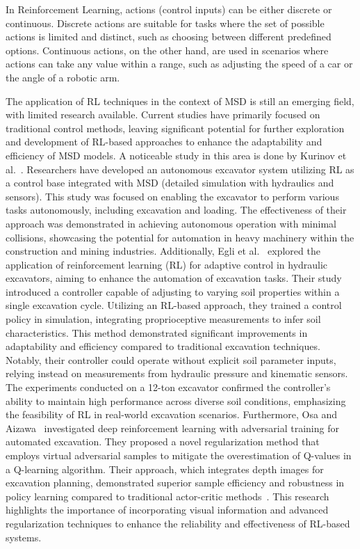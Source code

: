 In Reinforcement Learning, actions (control inputs) can be either discrete or continuous. Discrete actions are suitable for tasks where the set of possible actions is limited and distinct, such as choosing between different predefined options. Continuous actions, on the other hand, are used in scenarios where actions can take any value within a range, such as adjusting the speed of a car or the angle of a robotic arm. 

The application of RL techniques in the context of MSD is still an emerging field, with limited research available. Current studies have primarily focused on traditional control methods, leaving significant potential for further exploration and development of RL-based approaches to enhance the adaptability and efficiency of MSD models. A noticeable study in this area is done by Kurinov et al.~\cite{kurinov2020autoexcavator}. Researchers have developed an autonomous excavator system utilizing RL as a control base integrated with MSD (detailed simulation with hydraulics and sensors). This study was focused on enabling the excavator to perform various tasks autonomously, including excavation and loading. The effectiveness of their approach was demonstrated in achieving autonomous operation with minimal collisions, showcasing the potential for automation in heavy machinery within the construction and mining industries.  
Additionally, Egli et al.~\cite{egli2022soil} explored the application of reinforcement learning (RL) for adaptive control in hydraulic excavators, aiming to enhance the automation of excavation tasks. Their study introduced a controller capable of adjusting to varying soil properties within a single excavation cycle. Utilizing an RL-based approach, they trained a control policy in simulation, integrating proprioceptive measurements to infer soil characteristics. This method demonstrated significant improvements in adaptability and efficiency compared to traditional excavation techniques. Notably, their controller could operate without explicit soil parameter inputs, relying instead on measurements from hydraulic pressure and kinematic sensors. The experiments conducted on a 12-ton excavator confirmed the controller's ability to maintain high performance across diverse soil conditions, emphasizing the feasibility of RL in real-world excavation scenarios.
Furthermore, Osa and Aizawa~\cite{osa2022deep} investigated deep reinforcement learning with adversarial training for automated excavation. They proposed a novel regularization method that employs virtual adversarial samples to mitigate the overestimation of Q-values in a Q-learning algorithm. Their approach, which integrates depth images for excavation planning, demonstrated superior sample efficiency and robustness in policy learning compared to traditional actor-critic methods~\cite{sutton_reinforcement_2018}. This research highlights the importance of incorporating visual information and advanced regularization techniques to enhance the reliability and effectiveness of RL-based systems.

